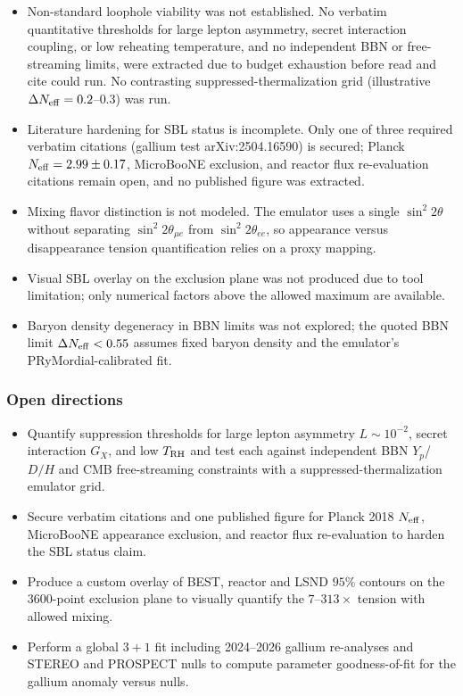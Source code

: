 \documentclass[11pt,a4paper]{article}
\begin{document}
\begin{itemize}
  \item Non-standard loophole viability was not established. No verbatim quantitative thresholds for large lepton asymmetry, secret interaction coupling, or low reheating temperature, and no independent BBN or free-streaming limits, were extracted due to budget exhaustion before read and cite could run. No contrasting suppressed-thermalization grid (illustrative $\Delta N_{\rm eff} = 0.2$--$0.3$) was run.
  \item Literature hardening for SBL status is incomplete. Only one of three required verbatim citations (gallium test arXiv:2504.16590) is secured; Planck $N_{\rm eff} = 2.99 \pm 0.17$, MicroBooNE exclusion, and reactor flux re-evaluation citations remain open, and no published figure was extracted.
  \item Mixing flavor distinction is not modeled. The emulator uses a single $\sin^2 2\theta$ without separating $\sin^2 2\theta_{\mu e}$ from $\sin^2 2\theta_{ee}$, so appearance versus disappearance tension quantification relies on a proxy mapping.
  \item Visual SBL overlay on the exclusion plane was not produced due to tool limitation; only numerical factors above the allowed maximum are available.
  \item Baryon density degeneracy in BBN limits was not explored; the quoted BBN limit $\Delta N_{\rm eff} < 0.55$ assumes fixed baryon density and the emulator's PRyMordial-calibrated fit.
\end{itemize}
\subsubsection*{Open directions}
\begin{itemize}
  \item Quantify suppression thresholds for large lepton asymmetry $L \sim 10^{-2}$, secret interaction $G_X$, and low $T_{\rm RH}$ and test each against independent BBN $Y_p$/$D/H$ and CMB free-streaming constraints with a suppressed-thermalization emulator grid.
  \item Secure verbatim citations and one published figure for Planck 2018 $N_{\rm eff}$, MicroBooNE appearance exclusion, and reactor flux re-evaluation to harden the SBL status claim.
  \item Produce a custom overlay of BEST, reactor and LSND $95\%$ contours on the 3600-point exclusion plane to visually quantify the $7$--$313\times$ tension with allowed mixing.
  \item Perform a global $3+1$ fit including 2024--2026 gallium re-analyses and STEREO and PROSPECT nulls to compute parameter goodness-of-fit for the gallium anomaly versus nulls.
\end{itemize}
\end{document}
